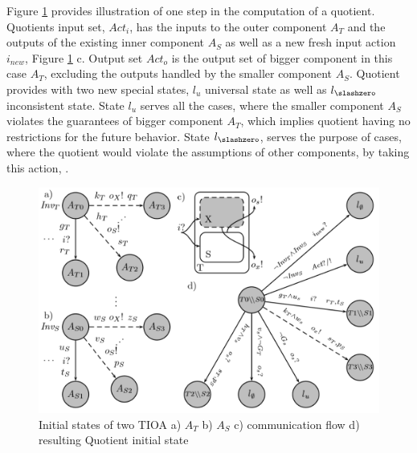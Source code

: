 Figure \ref{fig:quotient} provides illustration of one step in the computation of a quotient. Quotients input set, $Act_i$, has the inputs to the outer component $A_T$ and the outputs of the existing inner component $A_S$ as well as a new fresh input action $i_{new}$, Figure \ref{fig:quotient} c. Output set $Act_o$ is the output set of bigger component in this case $A_T$, excluding the outputs handled by the smaller component $A_S$. Quotient provides with two new special states, $l_u$ universal state as well as $l_{\slashzero}$ inconsistent state. State $l_u$ serves all the cases, where the smaller component $A_S$ violates the guarantees of bigger component $A_T$, which implies quotient having no restrictions for the future behavior. State $l_{\slashzero}$, serves the purpose of cases, where the quotient would violate the assumptions of other components, by taking this action, \textcite{10.1007/978-3-642-17071-3_15}.

\begin{figure}
  \centering
  \includegraphics[scale=0.4]{figures/Quotient.png}
  \caption{Initial states of two TIOA a) $A_T$ b) $A_S$ c) communication flow d) resulting Quotient initial state \textcite{10.1007/978-3-642-17071-3_15}}
  \label{fig:quotient}
\end{figure}